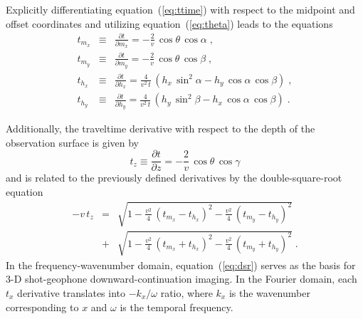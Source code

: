 
Explicitly differentiating equation~(\ref{eq:ttime}) with respect to the
midpoint and offset coordinates and utilizing equation~(\ref{eq:theta})
leads to the equations
\begin{eqnarray}
  \label{eq:tmx}
  t_{m_x} & \equiv & \frac{\partial t}{\partial m_x} = 
  -\frac{2}{v}\,\cos{\theta}\,\cos{\alpha}\;,
  \\ \label{eq:tmy}
  t_{m_y} & \equiv & \frac{\partial t}{\partial m_y} =
  -\frac{2}{v}\,\cos{\theta}\,\cos{\beta}\;,
  \\ \label{eq:thx}
  t_{h_x} & \equiv & \frac{\partial t}{\partial h_x} = 
  \frac{4}{v^2\,t}\,\left(h_x\,\sin^2{\alpha} - 
    h_y\,\cos{\alpha}\,\cos{\beta}\right)\;,
  \\ \label{eq:thy}
  t_{h_y} & \equiv & \frac{\partial t}{\partial h_y} = 
  \frac{4}{v^2\,t}\,\left(h_y\,\sin^2{\beta} - 
    h_x\,\cos{\alpha}\,\cos{\beta}\right)\;.
\end{eqnarray}

Additionally, the traveltime derivative with respect to the depth of the
observation surface is given by
\begin{equation}
  \label{eq:tz}
  t_z \equiv \frac{\partial t}{\partial z} = 
  -\frac{2}{v}\,\cos{\theta}\,\cos{\gamma}
\end{equation}
and is related to the previously defined derivatives by the double-square-root
equation
\begin{eqnarray}
  \nonumber
  - v\,t_z & = &  
  \sqrt{1-
    \frac{v^2}{4}\,\left(t_{m_x} - t_{h_x}\right)^2 - 
    \frac{v^2}{4}\,\left(t_{m_y} - t_{h_y}\right)^2} \\
  & + & 
  \sqrt{1-
    \frac{v^2}{4}\,\left(t_{m_x} + t_{h_x}\right)^2 - 
    \frac{v^2}{4}\,\left(t_{m_y} + t_{h_y}\right)^2}\;.
  \label{eq:dsr}
\end{eqnarray}
In the frequency-wavenumber domain, equation~(\ref{eq:dsr}) serves as the
basis for 3-D shot-geophone downward-continuation imaging. In the Fourier
domain, each $t_x$ derivative translates into $-k_x/\omega$ ratio, where $k_x$
is the wavenumber corresponding to $x$ and $\omega$ is the temporal frequency.

